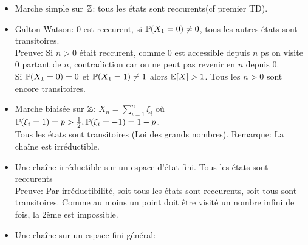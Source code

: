 \documentclass[]{report}
\begin{document}
    \begin{ex}{}{}
        \begin{itemize}
            \item Marche simple sur $\mathbb{Z}$: tous les états sont reccurents(cf premier TD).
            \item Galton Watson: $0$ est reccurent, si $\mathbb{P}(X_1=0)\neq 0$, tous les autres états sont transitoires.\\
            Preuve: Si $n>0$ était reccurent, comme $0$ est accessible depuis $n$ ps on visite $0$ partant de $n$, contradiction car on ne peut pas revenir en $n$ depuis $0$.\\
            Si $\mathbb{P}(X_1=0)=0$ et $\mathbb{P}(X_1=1)\neq 1$ alors $\mathbb{E}[X]>1$. Tous les $n>0$ sont encore transitoires.
            \item Marche biaisée sur $\mathbb{Z}$: $X_n= \sum_{i=1}^{n}\xi_i$ où $\mathbb{P}(\xi_i=1)=p>\frac{1}{2},\mathbb{P}(\xi_i=-1)=1-p$.\\
            Tous les états sont transitoires (Loi des grands nombres). Remarque: La chaîne est irréductible.
            \item Une chaîne irréductible sur un espace d'état fini. Tous les états sont reccurents\\
            Preuve: Par irréductibilité, soit tous les états sont reccurents, soit tous sont transitoires. Comme au moins un point doit être visité un nombre infini de fois, la 2ème est impossible.
            \item Une chaîne sur un espace fini général:\\
\end{itemize}
\end{ex}
\end{document}
